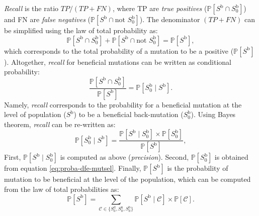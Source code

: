 \documentclass{article}
\newcommand{\proba}{\mathbb{P}}
\newcommand{\Sphy}{S_{0}}
\newcommand{\Sphyclass}{\mathcal{C}}
\newcommand{\given}{\mid}
\newcommand{\Spop}{S}
\newcommand{\PpolyAdv}{\proba [ \Spop^{\text{b}} ]}
\begin{document}
    \textit{Recall} is the ratio $TP / (TP + FN)$, where TP are \textit{true positives} ($\proba [ \Spop^{\text{b}}  \cap  \Sphy^{\text{b}}]$) and FN are \textit{false negatives} ($\proba [ \Spop^{\text{b}}  \cap \text{not } \Sphy^{\text{b}}]$).
    The denominator $(TP + FN)$ can be simplified using the law of total probability as:
    \begin{equation}
        \proba [ \Spop^{\text{b}}  \cap  \Sphy^{\text{b}}] + \proba [ \Spop^{\text{b}} \cap \text{not } \Sphy^{\text{b}}] = \proba [ \Spop^{\text{b}}],
    \end{equation}
    which corresponds to the total probability of a mutation to be a positive ($\proba [ \Spop^{\text{b}}]$).
    Altogether, \textit{recall} for beneficial mutations can be written as conditional probability:
    \begin{equation}
        \frac{\proba [ \Spop^{\text{b}} \cap  \Sphy^{\text{b}}]}{\proba [ \Spop^{\text{b}}]} = \proba [ \Sphy^{\text{b}}  \given \Spop^{\text{b}} ].
    \end{equation}
    Namely, \textit{recall} corresponds to the probability for a beneficial mutation at the level of population ($\Spop^{\text{b}}$) to be a beneficial back-mutation ($\Sphy^{\text{b}}$).
    Using Bayes theorem, \textit{recall} can be re-written as:
    \begin{equation}
        \proba [\Sphy^{\text{b}} \given \Spop^{\text{b}}] = \frac{\proba [\Spop^{\text{b}} \given \Sphy^{\text{b}}] \times \proba[\Sphy^{\text{b}}]}{\PpolyAdv},
        \label{eq:bayes}
    \end{equation}
    First, $\proba [\Spop^{\text{b}} \given \Sphy^{\text{b}}]$ is computed as above (\textit{precision}).
    Second, $\proba [ \Sphy^{\text{b}} ]$ is obtained from equation \ref{eq:proba-dfe-mutsel}.
    Finally, $\proba [ \Spop^{\text{b}} ]$ is the probability of mutation to be beneficial at the level of the population, which can be computed from the law of total probabilities as:
    \begin{equation}
        \proba [ \Spop^{\text{b}} ] = \sum_{\Sphyclass \in \{\Sphy^{\text{d}}, \Sphy^{\text{n}}, \Sphy^{\text{b}} \} }\proba [\Spop^{\text{b}} \given \Sphyclass ] \times \proba [\Sphyclass ].
        \label{eq:total_proba}
    \end{equation}
    \printbibliography
\end{document}
